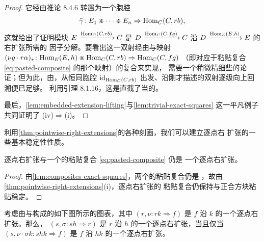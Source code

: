 \begin{proof}
它经由推论 8.4.6 转置为一个胞腔
\begin{equation*}
\bar{\gamma}\colon E_{1}\divideontimes\cdots\divideontimes E_{n}\Rightarrow\mathrm{Hom}_{C}(C,rb),
\end{equation*}
这就给出了证明模块 $E\xrightarrow{\mathrm{Hom}_{C}(C,rb)}C$ 是
$D\xrightarrow{\mathrm{Hom}_{C}(C,fg)}C$ 沿 $D\xrightarrow{\mathrm{Hom}_{E}(E,h)}E$ 的右扩张所需的
因子分解。要看出这一双射经由与映射
$(\nu g\cdot r\alpha)_{*}\colon \mathrm{Hom}_{E}(E,h)\divideontimes\mathrm{Hom}_{C}(C,rb)\Rightarrow\mathrm{Hom}_{C}(C,fg)$
（即对应于粘贴复合 \eqref{eq:pasted-composite} 的那个映射）的复合来实现，
需要一个稍微精细些的论证；但为此，由\trYonedaLemma，从恒同胞腔
$\mathrm{id}_{\mathrm{Hom}_{C}(C,rb)}$ 出发、沿刚才描述的双射逐级向上回溯便已足够。
利用引理 8.1.16，这是直截了当的。

最后，\cref{lem:embedded-extension-lifting}与\cref{lem:trivial-exact-squares}
这一平凡例子共同证明了 (iv)$\Rightarrow$(i)。
\end{proof}

利用\cref{thm:pointwise-right-extensions}的各种刻画，我们可以建立逐点右%
扩张的一些基本稳定性性质。

\begin{corollary}\label{cor:pasting-pointwise-right-extension}
逐点右扩张与一个\trExactSquare{}的粘贴复合 \eqref{eq:pasted-composite} 仍是
一个逐点右扩张。
\end{corollary}

\begin{proof}
由\cref{lem:composites-exact-squares}，两个\trExactSquare{}的粘贴复合仍是%
\trExactSquare，故由\cref{thm:pointwise-right-extensions}(i)，逐点右扩张的
粘贴复合仍保持与正合方块粘贴稳定。
\end{proof}

\begin{corollary}\label{cor:composite-pointwise-extensions}
考虑由\trFunctor{}与\trNaturalTransformation{}构成的如下图所示的图表，其中
$(r,\nu\colon rk\Rightarrow f)$ 是 $f$ 沿 $k$ 的一个逐点右扩张。那么，
$(s,\sigma\colon sh\Rightarrow r)$ 是 $r$ 沿 $h$ 的一个逐点右扩张，当且仅当
$(s,\nu\cdot\sigma k\colon shk\Rightarrow f)$ 是 $f$ 沿 $hk$ 的一个逐点右扩张。
\begin{center}
\end{center}
\end{corollary}

